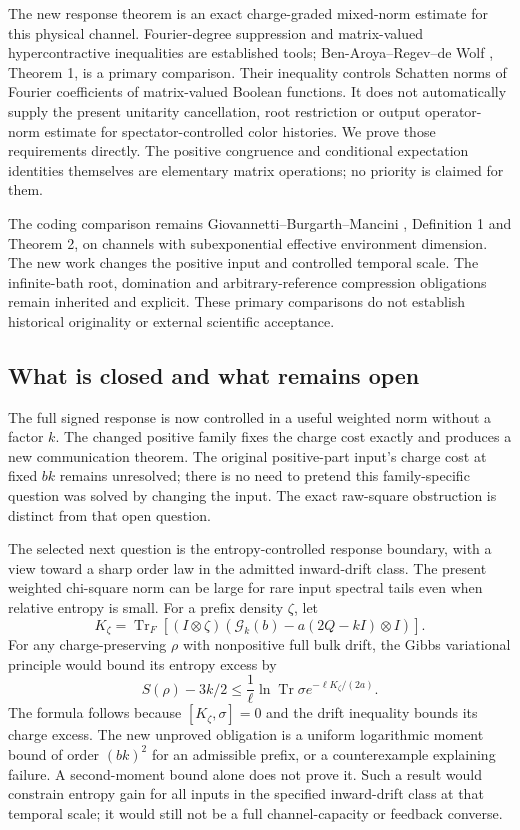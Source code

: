\documentclass[11pt]{article}
\newcommand{\Tr}{\operatorname{Tr}}
\begin{document}
The new response theorem is an exact charge-graded mixed-norm estimate
for this physical channel. Fourier-degree suppression and matrix-valued
hypercontractive inequalities are established tools; Ben-Aroya--Regev--de
Wolf \cite{BRW}, Theorem 1, is a primary comparison. Their inequality
controls Schatten norms of Fourier coefficients of matrix-valued Boolean
functions. It does not automatically supply the present unitarity
cancellation, root restriction or output operator-norm estimate for
spectator-controlled color histories. We prove those requirements directly.
The positive congruence and conditional expectation identities themselves
are elementary matrix operations; no priority is claimed for them.

The coding comparison remains Giovannetti--Burgarth--Mancini \cite{GBM},
Definition 1 and Theorem 2, on channels with subexponential effective
environment dimension. The new work changes the positive input and
controlled temporal scale. The infinite-bath root, domination and
arbitrary-reference compression obligations remain inherited and explicit.
These primary comparisons do not establish historical originality or
external scientific acceptance.

\subsection{What is closed and what remains open}

The full signed response is now controlled in a useful weighted norm
without a factor \(k\). The changed positive family fixes the charge cost
exactly and produces a new communication theorem. The original positive-part
input's charge cost at fixed \(bk\) remains unresolved; there is no need
to pretend this family-specific question was solved by changing the input.
The exact raw-square obstruction is distinct from that open question.

The selected next question is the entropy-controlled response boundary,
with a view toward a sharp order law in the admitted inward-drift class.
The present weighted chi-square norm can be large for rare input spectral
tails even when relative entropy is small. For a prefix density \(\zeta\),
let
\[
 K_\zeta=\Tr_F[(I\otimes\zeta)
       (\mathcal G_k(b)-a(2Q-kI)\otimes I)].
\]
For any charge-preserving \(\rho\) with nonpositive full bulk drift,
the Gibbs variational principle would bound its entropy excess by
\[
 S(\rho)-3k/2
 \le\frac1\ell\ln\Tr\sigma
       e^{-\ell K_\zeta/(2a)}.
\]
The formula follows because \([K_\zeta,\sigma]=0\) and the drift
inequality bounds its charge excess. The new unproved obligation is a
uniform logarithmic moment bound of order \((bk)^2\) for an admissible
prefix, or a counterexample explaining failure. A second-moment bound
alone does not prove it. Such a result would constrain entropy gain for
all inputs in the specified inward-drift class at that temporal scale;
it would still not be a full channel-capacity or feedback converse.
\end{document}
